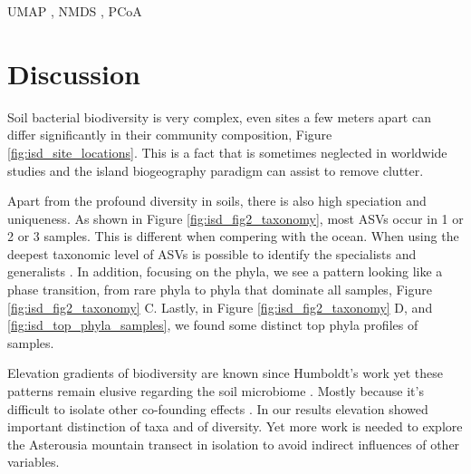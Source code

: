 UMAP , NMDS , PCoA




\section{Discussion}\label{discussion}

Soil bacterial biodiversity is very complex, even sites a few meters apart can differ
significantly in their community composition, Figure \ref{fig:isd_site_locations}.
This is a fact that is sometimes neglected in worldwide studies and the island biogeography
paradigm can assist to remove clutter.

Apart from the profound diversity in soils, there is also high speciation and uniqueness. 
As shown in Figure \ref{fig:isd_fig2_taxonomy}, most ASVs occur in 1 or 2 or 3 samples.
This is different when compering with the ocean. When using the deepest taxonomic
level of ASVs is possible to identify the specialists and generalists \parencite{Barberan2012}. 
In addition, focusing on the phyla, we see a pattern looking like a phase transition, from 
rare phyla to phyla that dominate all samples, Figure \ref{fig:isd_fig2_taxonomy} C. Lastly, in Figure \ref{fig:isd_fig2_taxonomy} D,
and \ref{fig:isd_top_phyla_samples}, we found some distinct top phyla profiles of samples.

Elevation gradients of biodiversity are known since Humboldt's work \parencite{Rahbek2019} 
yet these patterns remain elusive regarding the soil microbiome \parencite{Looby2020, Siles2023}.
Mostly because it's difficult to isolate other co-founding effects \parencite{Nottingham2018}.
In our results elevation showed important distinction of taxa and of diversity. Yet more work is 
needed to explore the Asterousia mountain transect in isolation to avoid indirect influences of 
other variables.


